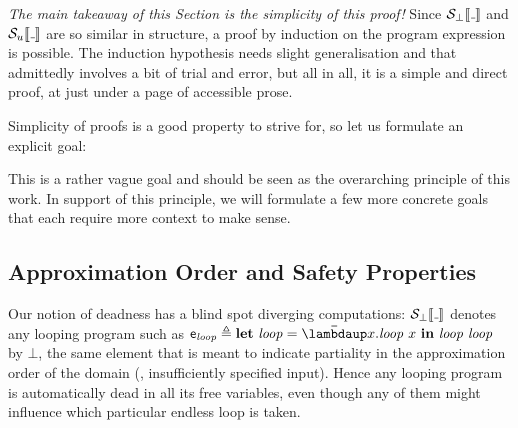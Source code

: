 \emph{The main takeaway of this Section is the simplicity of this proof!}
Since $\semscott{\wild}$ and $\semusg{\wild}$ are so similar in structure,
a proof by induction on the program expression is possible.
The induction hypothesis needs slight generalisation and that admittedly
involves a bit of trial and error, but all in all, it is a simple and direct
proof, at just under a page of accessible prose.

Simplicity of proofs is a good property to strive for, so let us formulate an
explicit goal:



This is a rather vague goal and should be seen as the overarching principle of
this work.
In support of this principle, we will formulate a few more concrete goals that
each require more context to make sense.

\subsection{Approximation Order and Safety Properties}
\label{sec:continuity}

Our notion of deadness has a blind spot \wrt diverging computations:
$\semscott{\wild}$ denotes any looping program such as
$\pe_{\mathit{loop}} \triangleq \Let{\mathit{loop}}{\Lam{x}{\mathit{loop}~x}}{{\mathit{loop}~\mathit{loop}}}$ by $\bot$, the
same element that is meant to indicate partiality in the approximation order
of the domain (\eg, insufficiently specified input).
Hence any looping program is automatically dead in all its free variables, even
though any of them might influence which particular endless loop is taken.

